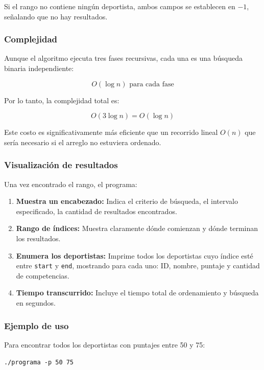 Si el rango no contiene ningún deportista, ambos campos se establecen en $-1$, señalando que no hay resultados.

\subsubsection{Complejidad}

Aunque el algoritmo ejecuta tres fases recursivas, cada una es una búsqueda binaria independiente:

\[
O(\log n) \text{ para cada fase}
\]

Por lo tanto, la complejidad total es:

\[
O(3 \log n) = O(\log n)
\]

Este costo es significativamente más eficiente que un recorrido lineal \(O(n)\) que sería necesario si el arreglo no estuviera ordenado.

\subsubsection{Visualización de resultados}

Una vez encontrado el rango, el programa:

\begin{enumerate}
    \item \textbf{Muestra un encabezado:} Indica el criterio de búsqueda, el intervalo especificado, la cantidad de resultados encontrados.
    
    \item \textbf{Rango de índices:} Muestra claramente dónde comienzan y dónde terminan los resultados.
    
    \item \textbf{Enumera los deportistas:} Imprime todos los deportistas cuyo índice esté entre \texttt{start} y \texttt{end}, mostrando para cada uno: ID, nombre, puntaje y cantidad de competencias.
    
    \item \textbf{Tiempo transcurrido:} Incluye el tiempo total de ordenamiento y búsqueda en segundos.
\end{enumerate}

\subsubsection{Ejemplo de uso}

Para encontrar todos los deportistas con puntajes entre 50 y 75:

\texttt{./programa -p 50 75}

